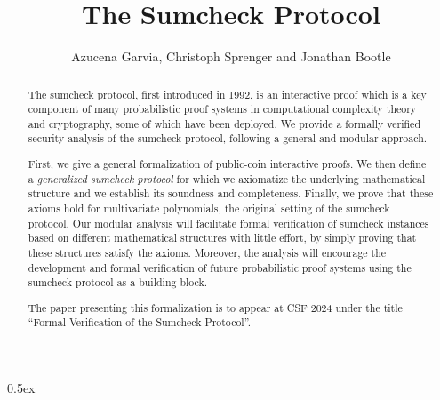 \documentclass[11pt,a4paper]{article}
\begin{document}
\title{The Sumcheck Protocol}
\author{Azucena Garvia, Christoph Sprenger and Jonathan Bootle}

\maketitle

\begin{abstract}
The sumcheck protocol, first introduced in 1992, is an interactive proof which is a key component of many probabilistic proof systems in computational complexity theory and cryptography, some of which have been deployed. We provide a formally verified security analysis of the sumcheck protocol, following a general and modular approach.

First, we give a general formalization of public-coin interactive proofs. We then define a \emph{generalized sumcheck protocol} for which we axiomatize the underlying mathematical structure and we establish its soundness and completeness. Finally, we prove that these axioms hold for multivariate polynomials, the original setting of the sumcheck protocol.
%
Our modular analysis will facilitate formal verification of sumcheck instances based on different mathematical structures with little effort, by simply proving that these structures satisfy the axioms.
%
Moreover, the analysis will encourage the development and formal verification of future probabilistic proof systems using the sumcheck protocol as a building block.

The paper presenting this formalization is to appear at CSF 2024 under the title ``Formal Verification of the Sumcheck Protocol''.
\end{abstract}


\tableofcontents

\newpage


\parindent 0pt\parskip 0.5ex





%
%
\end{document}
